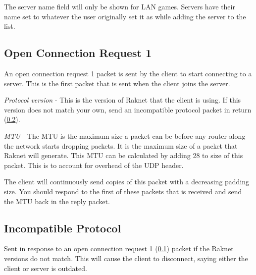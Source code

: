 The server name field will only be shown for LAN games.
Servers have their name set to whatever the user originally set it as while adding the server to the list.

\subsection{Open Connection Request 1}\label{subsec:open-connection-request1}

An open connection request 1 packet is sent by the client to start connecting to a server.
This is the first packet that is sent when the client joins the server.


\textit{Protocol version} - This is the version of Raknet that the client is using.
If this version does not match your own, send an incompatible protocol packet in return
(\ref{subsec:incompatible-protocol}). 

\textit{MTU} - The MTU is the maximum size a packet can be before any router along the network
starts dropping packets. It is the maximum size of a packet that Raknet will generate.
This MTU can be calculated by adding 28 to size of this packet. This is to account for overhead of the UDP header.

The client will continuously send copies of this packet with a decreasing padding size.
You should respond to the first of these packets that is received and send the MTU back in the reply packet.

\subsection{Incompatible Protocol}\label{subsec:incompatible-protocol}

Sent in response to an open connection request 1 (\ref{subsec:open-connection-request1}) packet if the Raknet versions do not match.
This will cause the client to disconnect, saying either the client or server is outdated.


